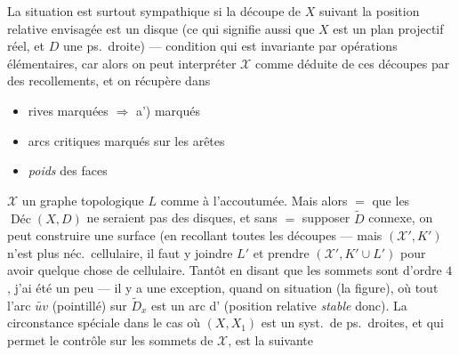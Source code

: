 \documentclass[11pt,a4paper]{article}
\begin{document}
La situation est surtout sympathique si la découpe de $X$ suivant la position relative envisagée est un disque (ce qui signifie aussi que $X$ est un plan projectif réel, et $D$ une ps.\ droite) --- condition qui est invariante par opérations élémentaires, car alors on peut interpréter $\mathcal{X}$ comme déduite de ces découpes par des recollements, et on récupère dans

\begin{itemize}
\item[a)] rives marquées $\Rightarrow$ a')   marqués
\item[b)] arcs critiques marqués sur les arêtes
\item[c)] \emph{poids} des faces
\end{itemize}

$\mathcal{X}$ un graphe topologique $L$ comme à l'accoutumée. Mais alors $=$ que les $\operatorname{Déc}(X, D)$ ne seraient pas des disques, et sans $=$ supposer $\widetilde{D}$ connexe, on peut construire une   surface (en recollant toutes les découpes --- mais $(\mathcal{X}', K')$ n'est plus néc.\ cellulaire, il faut y joindre $L'$ et prendre $(\mathcal{X}', K' \cup L')$ pour avoir quelque chose de cellulaire.
Tantôt en disant que les sommets  sont d'ordre $4$, j'ai été un peu  --- il y a une exception, quand on  \struck{\ill{}} situation  (la figure), où \struck{\ill{}} tout l'arc $\widetilde{uv}$ (pointillé) sur $\widetilde{D}_x$ est un arc d' (position relative \emph{stable} donc). La circonstance spéciale dans le cas où $(X, X_1)$ est un syst.\ de ps.\ droites, et qui permet le contrôle sur les sommets de $\mathcal{X}$, est la suivante
\end{document}
